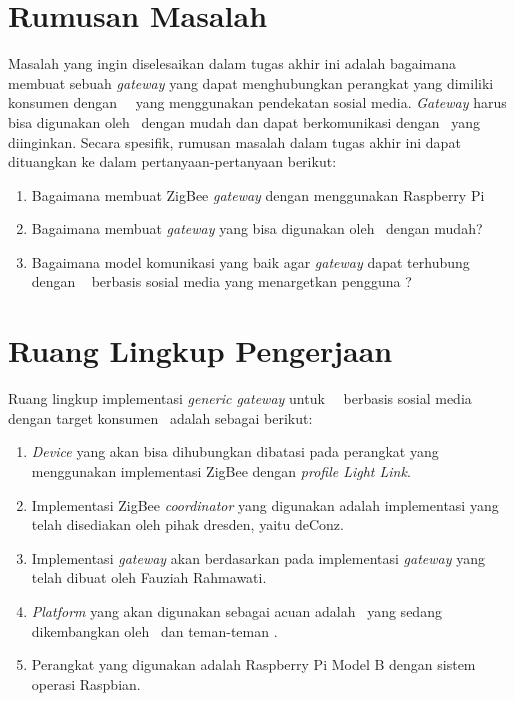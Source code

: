 \section{Rumusan Masalah}
Masalah yang ingin diselesaikan dalam tugas akhir ini adalah bagaimana membuat sebuah \textit{gateway} yang dapat menghubungkan perangkat yang dimiliki konsumen dengan \plat~\iot~yang menggunakan pendekatan sosial media. \textit{Gateway} harus bisa digunakan oleh \eu~dengan mudah dan dapat berkomunikasi dengan \plat~yang diinginkan. Secara spesifik, rumusan masalah dalam tugas akhir ini dapat dituangkan ke dalam pertanyaan-pertanyaan berikut:
\begin{enumerate}
	\item Bagaimana membuat ZigBee \textit{gateway} dengan menggunakan Raspberry Pi
	\item Bagaimana membuat \textit{gateway} yang bisa digunakan oleh \eu~dengan mudah?
	\item Bagaimana model komunikasi yang baik agar \textit{gateway} dapat terhubung dengan \plat~ berbasis sosial media yang menargetkan pengguna \eu?
\end{enumerate}


\section{Ruang Lingkup Pengerjaan}
Ruang lingkup implementasi \textit{generic gateway} untuk \plat~\iot~berbasis sosial media dengan target konsumen \eu~adalah sebagai berikut:
\begin{enumerate}
	\item \textit{Device} yang akan bisa dihubungkan dibatasi pada perangkat yang menggunakan implementasi ZigBee dengan \textit{profile Light Link}.
	\item Implementasi ZigBee \textit{coordinator} yang digunakan adalah implementasi yang telah disediakan oleh pihak dresden, yaitu deConz.
	\item Implementasi \textit{gateway} akan berdasarkan pada implementasi \textit{gateway} yang telah dibuat oleh Fauziah Rahmawati\cite{SkripsiFarah}.
	\item \textit{Platform} yang akan digunakan sebagai acuan adalah \plat~yang sedang dikembangkan oleh \saya~dan teman-teman \saya.
	\item Perangkat yang digunakan adalah Raspberry Pi Model B dengan sistem operasi Raspbian.
	
\end{enumerate}

